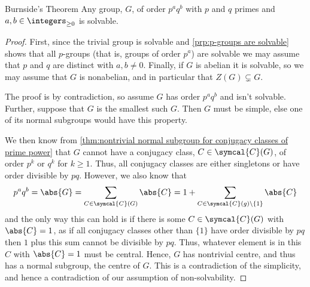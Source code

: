 \documentclass[fleqn]{NotesClass}
\newcommand{\conjugacyClasses}{\symcal{C}}
\begin{document}
    \begin{thm}{Burnside's Theorem}{}
        Any group, \(G\), of order \(p^aq^b\) with \(p\) and \(q\) primes and \(a, b \in \integers_{\ge 0}\) is solvable.
        \begin{proof}
            First, since the trivial group is solvable and \cref{prp:p-groups are solvable} shows that all \(p\)-groups (that is, groups of order \(p^a\)) are solvable we may assume that \(p\) and \(q\) are distinct with \(a, b \ne 0\).
            Finally, if \(G\) is abelian it is solvable, so we may assume that \(G\) is nonabelian, and in particular that \(Z(G) \subsetneq G\).
            
            The proof is by contradiction, so assume \(G\) has order \(p^aq^b\) and isn't solvable.
            Further, suppose that \(G\) is the smallest such \(G\).
            Then \(G\) must be simple, else one of its normal subgroups would have this property.
            
            We then know from \cref{thm:nontrivial normal subgroup for conjugacy classes of prime power} that \(G\) cannot have a conjugacy class, \(C \in \conjugacyClasses(G)\), of order \(p^k\) or \(q^k\) for \(k \ge 1\).
            Thus, all conjugacy classes are either singletons or have order divisible by \(pq\).
            However, we also know that
            \begin{equation}
                p^a q^b = \abs{G} = \sum_{C \in \conjugacyClasses(G)} \abs{C} = 1 + \sum_{C \in \conjugacyClasses(g) \setminus \{1\}} \abs{C}
            \end{equation}
            and the only way this can hold is if there is some \(C \in \conjugacyClasses(G)\) with \(\abs{C} = 1\), as if all conjugacy classes other than \(\{1\}\) have order divisible by \(pq\) then \(1\) plus this sum cannot be divisible by \(pq\).
            Thus, whatever element is in this \(C\) with \(\abs{C} = 1\) must be central.
            Hence, \(G\) has nontrivial centre, and thus has a normal subgroup, the centre of \(G\).
            This is a contradiction of the simplicity, and hence a contradiction of our assumption of non-solvability.
        \end{proof}
    \end{thm}
    
	\appendixpage
	\begin{appendices}
	    
	\end{appendices}

    \backmatter
    \renewcommand{\glossaryname}{Acronyms}
    \printglossary[acronym]
    \printindex
\end{document}
